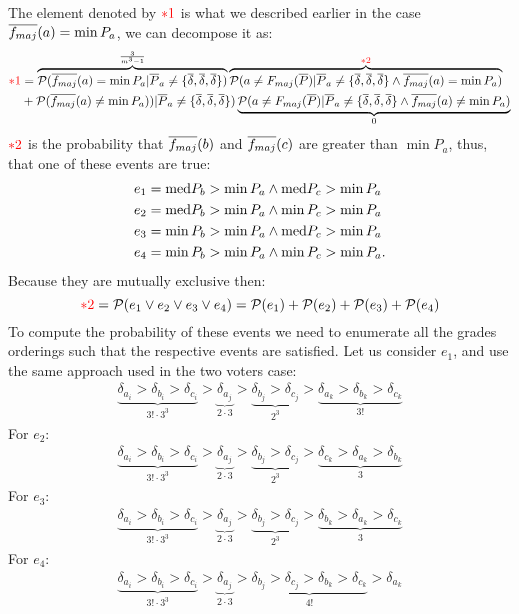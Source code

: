 \documentclass[version=3.21, pagesize, twoside=off, bibliography=totoc, DIV=calc, fontsize=12pt, a4paper]{scrartcl}
\begin{document}
The element denoted by ${\color{red}*1}$ is what we described earlier in the case $\overline{f_{maj}}(a)= \min{P_a}$, we can decompose it as:
\begin{align}
	{\color{red}*1} &=\overbrace{\mathcal{P}(\overline{f_{maj}}(a)= \min{P_a}|\overline{P}_a\neq\{\overline{\delta},\overline{\delta},\overline{\delta}\})}^{\frac{3}{m^3-1}} \overbrace{\mathcal{P}(a\neq F_{maj}(\overline{P})|\overline{P}_a\neq\{\overline{\delta},\overline{\delta},\overline{\delta}\} \wedge \overline{f_{maj}}(a)= \min{P_a})}^{{\color{red}*2}}\\
	&+\mathcal{P}(\overline{f_{maj}}(a)\neq \min{P_a})) |\overline{P}_a\neq\{\overline{\delta},\overline{\delta},\overline{\delta}\}) \underbrace{\mathcal{P}(a\neq F_{maj}(\overline{P})|\overline{P}_a\neq\{\overline{\delta},\overline{\delta},\overline{\delta}\} \wedge \overline{f_{maj}}(a)\neq \min{P_a})}_{0}
\end{align}
${\color{red}*2}$ is the probability that $\overline{f_{maj}}(b)$ and $\overline{f_{maj}}(c)$ are greater than $\min{P_a}$, thus, that one of these events are true:
\begin{align}
	e_1 &= \text{med}{P_{b}}>\min{P_{a}} \wedge \text{med}{P_{c}}>\min{P_{a}}\\
	e_2 &= \text{med}{P_{b}}>\min{P_{a}} \wedge \min{P_{c}}>\min{P_{a}}\\
	e_3 &= \min{P_{b}}>\min{P_{a}} \wedge \text{med}{P_{c}}>\min{P_{a}}\\
	e_4 &= \min{P_{b}}>\min{P_{a}} \wedge \min{P_{c}}>\min{P_{a}}.
\end{align}	
Because they are mutually exclusive then:
	\[{\color{red}*2} =\mathcal{P}(e_1 \vee e_2 \vee e_3 \vee e_4)=\mathcal{P}(e_1)+\mathcal{P}(e_2)+\mathcal{P}(e_3)+\mathcal{P}(e_4)\]
 To compute the probability of these events we need to enumerate all the grades orderings such that the respective events are satisfied. Let us consider $e_1$, and use the same approach used in the two voters case:
 \begin{align}
 	\underbrace{\delta_{a_i}>\delta_{b_i}>\delta_{c_i}}_{3!\cdot 3^3}>\underbrace{\delta_{a_j}}_{2 \cdot 3}>\underbrace{\delta_{b_j}>\delta_{c_j}}_{2^3}>\underbrace{\delta_{a_k}>\delta_{b_k}>\delta_{c_k}}_{3!}
 \end{align}
 For $e_2$:
 \begin{align}
 	\underbrace{\delta_{a_i}>\delta_{b_i}>\delta_{c_i}}_{3!\cdot 3^3}>\underbrace{\delta_{a_j}}_{2 \cdot 3}>\underbrace{\delta_{b_j}>\delta_{c_j}}_{2^3}>\underbrace{\delta_{c_k}>\delta_{a_k}>\delta_{b_k}}_{3}
 \end{align}
 For $e_3$:
\begin{align}
	\underbrace{\delta_{a_i}>\delta_{b_i}>\delta_{c_i}}_{3!\cdot 3^3}>\underbrace{\delta_{a_j}}_{2 \cdot 3}>\underbrace{\delta_{b_j}>\delta_{c_j}}_{2^3}>\underbrace{\delta_{b_k}>\delta_{a_k}>\delta_{c_k}}_{3}
\end{align}
 For $e_4$:
 \begin{align}
 	\underbrace{\delta_{a_i}>\delta_{b_i}>\delta_{c_i}}_{3!\cdot 3^3}>\underbrace{\delta_{a_j}}_{2 \cdot 3}>\underbrace{\delta_{b_j}>\delta_{c_j}>\delta_{b_k}>\delta_{c_k}}_{4!}>\delta_{a_k}
 \end{align}
\end{document}
